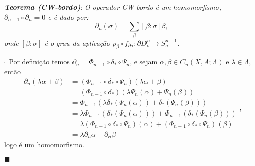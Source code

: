 \documentclass[12pt]{book}
\newcommand{\celulabordo}[2]{\partial D^{#1}_{#2}}
\newcommand{\tese}[3]{\vspace{2mm} \textit{\textbf{#1}}: \textit{#2} \par $\square$ #3 \par $\blacksquare$}
\begin{document}
	\tese{Teorema (CW-bordo)}{O operador  CW-bordo é um homomorfismo, $\partial_{n-1}\circ\partial_{n} = 0$ e é dado por:
	$$
	\partial_{n}(\sigma) = \sum_{\beta}[\beta:\sigma]\beta,
	$$
	onde $[\beta:\sigma]$ é o grau da aplicação $p_{\beta} \circ f_{\partial\sigma}:\celulabordo{n}{\sigma} \to S^{n-1}_{\sigma}$.}{Por definição temos $\partial_{n} = \Phi_{n-1} \circ \delta_{*} \circ \Psi_{n}$, e sejam $\alpha,\beta \in C_{n}(X,A; \Lambda)$ e $\lambda \in \Lambda$, então
	$$ 
	\begin{aligned}
	\partial_{n}(\lambda \alpha+\beta) &= (\Phi_{n-1} \circ \delta_{*} \circ \Psi_{n})(\lambda \alpha+\beta)
	\\
	&= (\Phi_{n-1} \circ \delta_{*}) (\lambda\Psi_{n}(\alpha) + \Psi_{n}(\beta))
	\\
	&= \Phi_{n-1}(\lambda\delta_{*}(\Psi_{n}(\alpha)) + \delta_{*}(\Psi_{n}(\beta)))
	\\
	&= \lambda \Phi_{n-1}(\delta_{*}(\Psi_{n}(\alpha))) + \Phi_{n-1}(\delta_{*}(\Psi_{n}(\beta)))
	\\
	&=\lambda (\Phi_{n-1}\circ\delta_{*} \circ\Psi_{n})(\alpha) + (\Phi_{n-1}\circ\delta_{*} \circ\Psi_{n})(\beta)
	\\
	&= \lambda\partial_{n}\alpha +\partial_{n}\beta
	\end{aligned},
	$$
	logo é um homomorfismo.
	
}
\end{document}
